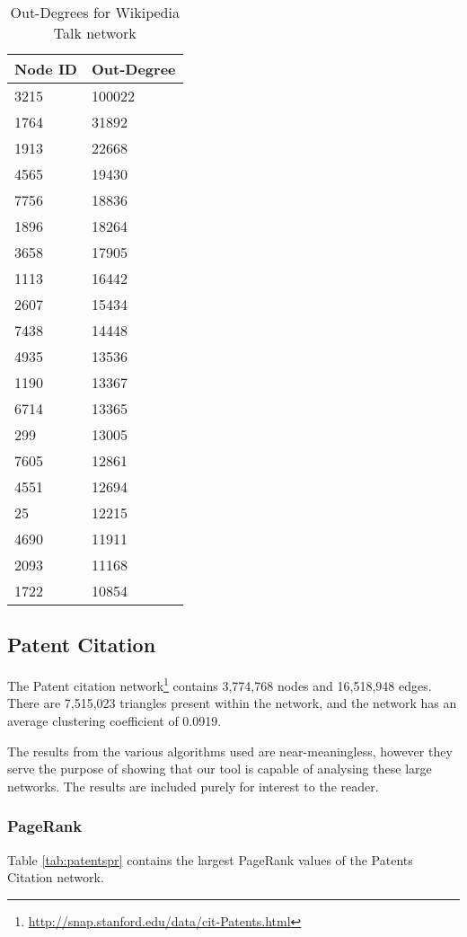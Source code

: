 \begin{table}[htbp]%
\centering
\begin{tabular}{|l|l|}
\hline
Node ID & Out-Degree \\
\hline
3215 & 100022 \\
1764 & 31892 \\
1913 & 22668 \\
4565 & 19430 \\
7756 & 18836 \\
1896 & 18264 \\
3658 & 17905 \\
1113 & 16442 \\
2607 & 15434 \\
7438 & 14448 \\
4935 & 13536 \\
1190 & 13367 \\
6714 & 13365 \\
299 & 13005 \\
7605 & 12861 \\
4551 & 12694 \\
25 & 12215 \\
4690 & 11911 \\
2093 & 11168 \\
1722 & 10854 \\
\hline
\end{tabular}
\caption{Out-Degrees for Wikipedia Talk network}
\label{tab:wikitalkout}
\end{table}

\subsection{Patent Citation}
The Patent citation network\footnote{\url{http://snap.stanford.edu/data/cit-Patents.html}} contains 3,774,768 nodes and 16,518,948 edges. There are 7,515,023 triangles present within the network, and the network has an average clustering coefficient of 0.0919.

The results from the various algorithms used are near-meaningless, however they serve the purpose of showing that our tool is capable of analysing these large networks. The results are included purely for interest to the reader.

\subsubsection{PageRank}
Table \ref{tab:patentspr} contains the largest PageRank values of the Patents Citation network.


